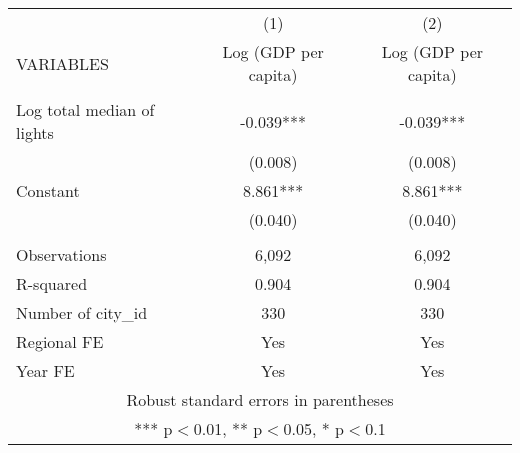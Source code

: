 \documentclass[]{article}
\begin{document}
\begin{tabular}{lcc} \hline
 & (1) & (2) \\
VARIABLES & Log (GDP per capita) & Log (GDP per capita) \\ \hline
 &  &  \\
Log total median of lights & -0.039*** & -0.039*** \\
 & (0.008) & (0.008) \\
Constant & 8.861*** & 8.861*** \\
 & (0.040) & (0.040) \\
 &  &  \\
Observations & 6,092 & 6,092 \\
R-squared & 0.904 & 0.904 \\
Number of city\_id & 330 & 330 \\
Regional FE & Yes & Yes \\
 Year FE & Yes & Yes \\ \hline
\multicolumn{3}{c}{ Robust standard errors in parentheses} \\
\multicolumn{3}{c}{ *** p$<$0.01, ** p$<$0.05, * p$<$0.1} \\
\end{tabular}
\end{document}

